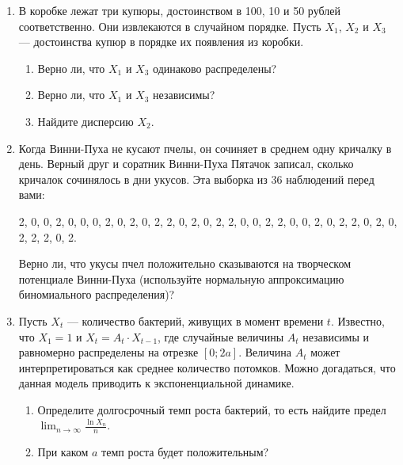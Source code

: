\begin{enumerate}
\item В коробке лежат три купюры, достоинством в 100, 10 и 50 рублей
соответственно. Они извлекаются в случайном порядке. Пусть $X_1$, $X_2$ и $X_3$ —
достоинства купюр в порядке их появления из коробки.
\begin{enumerate}
\item Верно ли, что $X_1$ и $X_3$ одинаково распределены?
\item Верно ли, что $X_1$ и $X_3$ независимы?
\item Найдите дисперсию $X_2$.
\end{enumerate}
\item Когда Винни-Пуха не кусают пчелы, он сочиняет в среднем одну кричалку в день.
Верный друг и соратник Винни-Пуха Пятачок записал, сколько кричалок сочинялось в дни
укусов. Эта выборка из 36 наблюдений перед вами:

2, 0, 0, 2, 0, 0, 0, 2, 0, 2, 0, 2, 2, 0, 2, 0, 2, 2, 0, 0, 2, 2, 0, 0, 2, 0, 2, 2, 0, 2, 0, 2, 2, 2, 0, 2.

Верно ли, что укусы пчел положительно сказываются на творческом потенциале Винни-Пуха
(используйте нормальную аппроксимацию биномиального распределения)?

\item Пусть $X_t$ — количество бактерий, живущих в момент времени $t$. Известно,
что $X_1 =1$ и $X_t = A_t \cdot X_{t-1}$, где случайные величины $A_t$ независимы и
равномерно распределены на отрезке $[0; 2a]$. Величина $A_t$ может интерпретироваться
как среднее количество потомков. Можно догадаться, что данная модель приводить к
экспоненциальной динамике.
\begin{enumerate}
\item Определите долгосрочный темп роста бактерий, то есть найдите предел
$\lim_{n\to\infty}\frac{\ln X_n}{n}$.
\item При каком $a$ темп роста будет положительным?
\end{enumerate}
\end{enumerate}
